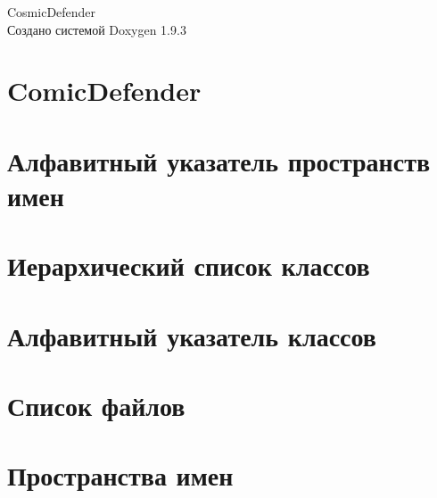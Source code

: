 \documentclass[twoside]{book}
\newcommand{\+}{\discretionary{\mbox{\scriptsize$\hookleftarrow$}}{}{}}
\newcommand{\clearemptydoublepage}{%
    \newpage{\pagestyle{empty}\cleardoublepage}%
  }
\begin{document}
  \raggedbottom
    \hypersetup{pageanchor=false,
                bookmarksnumbered=true,
                pdfencoding=unicode
               }
  \begin{titlepage}
  \vspace*{7cm}
  \begin{center}%
  {\Large Cosmic\+Defender}\\
  \vspace*{1cm}
  {\large Создано системой Doxygen 1.9.3}\\
  \end{center}
  \end{titlepage}
  \clearemptydoublepage
  \tableofcontents
  \clearemptydoublepage
  \hypersetup{pageanchor=true}
\chapter{Comic\+Defender}
\label{md__r_e_a_d_m_e}

\chapter{Алфавитный указатель пространств имен}

\chapter{Иерархический список классов}

\chapter{Алфавитный указатель классов}

\chapter{Список файлов}

\chapter{Пространства имен}













\end{document}
